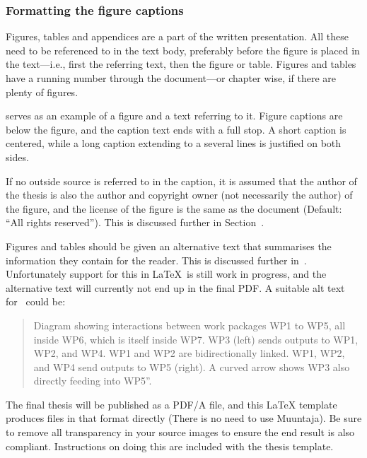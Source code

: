\subsubsection{Formatting the figure captions}
Figures, tables and appendices are a part of the written
presentation. All these need to be referenced to in the text body,
preferably before the figure is placed in the text---i.e., first the
referring text, then the figure or table. Figures and tables have a
running number through the document---or chapter wise, if there are
plenty of figures.

 serves as an example of a figure and a text
referring to it. Figure captions are below the figure, and the caption
text ends with a full stop. A short caption is centered, while a long
caption extending to a several lines is justified on both sides. 

If no outside source is referred to in the caption, it is assumed that
the author of the thesis is also the author and copyright owner (not necessarily the author) of the figure, and the license of the figure is the same as the document (Default: \enquote{All rights reserved}). This is discussed further in Section~.

Figures and tables should be given an alternative text that summarises
the information they contain for the reader. This is discussed further
in~. Unfortunately support for this in
\LaTeX\ is still work in progress, and the alternative text will
currently not end up in the final PDF. A suitable alt text
for~ could be:

\begin{quote}
  Diagram showing interactions between work packages WP1 to WP5, all inside WP6, which is itself inside WP7. WP3 (left) sends outputs to WP1, WP2, and WP4. WP1 and WP2 are bidirectionally linked. WP1, WP2, and WP4 send outputs to WP5 (right). A curved arrow shows WP3 also directly feeding into WP5''.
\end{quote} 

The final thesis will be published as a PDF/A file, and this LaTeX
template produces files in that format directly (There is no need to
use Muuntaja). Be sure to remove all transparency in your source
images to ensure the end result is also compliant. Instructions on doing this are included with the thesis template.

